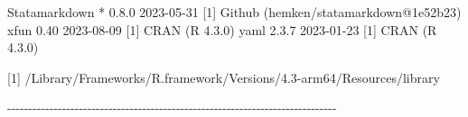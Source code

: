 \documentclass[
  10pt,
  a4paper,
]{book}
\newenvironment{Shaded}{\begin{snugshade}}{\end{snugshade}}
\newcommand{\DecValTok}[1]{\textcolor[rgb]{0.68,0.00,0.00}{#1}}
\newcommand{\FloatTok}[1]{\textcolor[rgb]{0.68,0.00,0.00}{#1}}
\newcommand{\FunctionTok}[1]{\textcolor[rgb]{0.28,0.35,0.67}{#1}}
\newcommand{\NormalTok}[1]{\textcolor[rgb]{0.00,0.46,0.62}{#1}}
\newcommand{\SpecialCharTok}[1]{\textcolor[rgb]{0.37,0.37,0.37}{#1}}
\begin{document}
\begin{Shaded}
\begin{Highlighting}[]
\NormalTok{ Statamarkdown }\SpecialCharTok{*} \DecValTok{0}\NormalTok{.}\FloatTok{8.0}   \DecValTok{2023{-}05{-}31}\NormalTok{ [}\DecValTok{1}\NormalTok{] }\FunctionTok{Github}\NormalTok{ (hemken}\SpecialCharTok{/}\NormalTok{statamarkdown}\SpecialCharTok{@}\FloatTok{1e52}\NormalTok{b23)}
\NormalTok{ xfun            }\FloatTok{0.40}    \DecValTok{2023{-}08{-}09}\NormalTok{ [}\DecValTok{1}\NormalTok{] }\FunctionTok{CRAN}\NormalTok{ (R }\DecValTok{4}\NormalTok{.}\FloatTok{3.0}\NormalTok{)}
\NormalTok{ yaml            }\DecValTok{2}\NormalTok{.}\FloatTok{3.7}   \DecValTok{2023{-}01{-}23}\NormalTok{ [}\DecValTok{1}\NormalTok{] }\FunctionTok{CRAN}\NormalTok{ (R }\DecValTok{4}\NormalTok{.}\FloatTok{3.0}\NormalTok{)}

\NormalTok{ [}\DecValTok{1}\NormalTok{] }\SpecialCharTok{/}\NormalTok{Library}\SpecialCharTok{/}\NormalTok{Frameworks}\SpecialCharTok{/}\NormalTok{R.framework}\SpecialCharTok{/}\NormalTok{Versions}\SpecialCharTok{/}\FloatTok{4.3}\SpecialCharTok{{-}}\NormalTok{arm64}\SpecialCharTok{/}\NormalTok{Resources}\SpecialCharTok{/}\NormalTok{library}

\SpecialCharTok{{-}{-}{-}{-}{-}{-}{-}{-}{-}{-}{-}{-}{-}{-}{-}{-}{-}{-}{-}{-}{-}{-}{-}{-}{-}{-}{-}{-}{-}{-}{-}{-}{-}{-}{-}{-}{-}{-}{-}{-}{-}{-}{-}{-}{-}{-}{-}{-}{-}{-}{-}{-}{-}{-}{-}{-}{-}{-}{-}{-}{-}{-}{-}{-}{-}{-}{-}{-}{-}{-}{-}{-}{-}{-}{-}{-}{-}{-}}
\end{Highlighting}
\end{Shaded}


  

\backmatter
\end{document}
